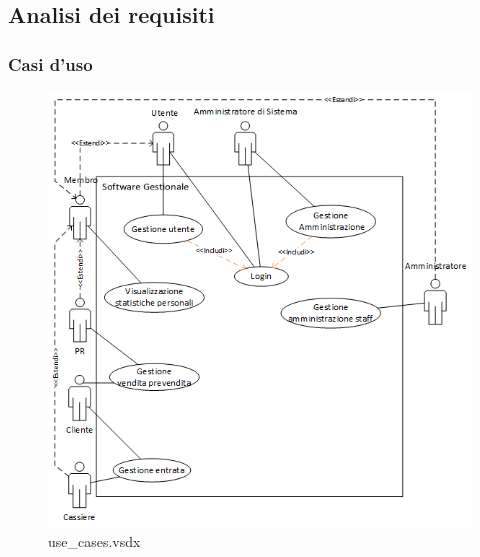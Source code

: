 \documentclass[a4paper]{article}
\begin{document}
\subsection{Analisi dei requisiti}
\subsubsection{Casi d'uso}




\begin{figure}[H]
    \includegraphics[scale=1]{Analisi/Cases/use_cases.png}
    \centering
    \caption{use\_cases.vsdx}
\end{figure}
\end{document}

